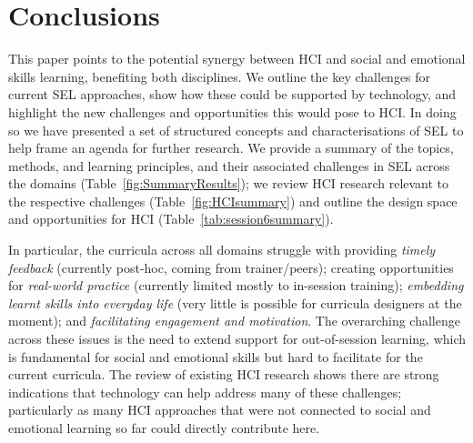 \documentclass[prodmode,acmtochi]{acmsmall}
\newcommand{\todo}[1]{\textrm{\textrm{\textcolor{LightBlue}{[[#1]]} } } }
\newcommand{\rephrase}[1]{\textrm{\textrm{\textcolor{gray}{#1}}}}
\begin{document}


\fi

\fi 

\section{Conclusions}
\label{sec:conclusion}

This paper points to the potential synergy between HCI and social and emotional skills learning, benefiting both disciplines.
%
We outline the key challenges for current SEL approaches, show how these could be supported by technology, and highlight the new challenges and opportunities this would pose to HCI.
%
In doing so we have presented a set of structured concepts and characterisations of SEL to help frame an agenda for further research. We provide a summary of the topics, methods, and learning principles, and their associated challenges in SEL across the domains (Table~\ref{fig:SummaryResults}); we review HCI research relevant to the respective challenges (Table~\ref{fig:HCIsummary}) and outline the design space and opportunities for HCI  (Table~\ref{tab:session6summary}).

In particular, the curricula across all domains struggle with providing \emph{timely feedback} (currently post-hoc, coming from trainer/peers); creating opportunities for \emph{real-world practice} (currently limited mostly to in-session training); \emph{embedding learnt skills into everyday life} (very little is possible for curricula designers at the moment); and \emph{facilitating engagement and motivation}. The overarching challenge across these issues is the need to extend support for out-of-session learning, which is fundamental for social and emotional skills  but hard to facilitate for the current curricula.
%
The review of existing HCI research shows there are strong indications that technology can help address many of these challenges; particularly as many HCI approaches that were not connected to social and emotional learning so far could directly contribute here.
\end{document}
